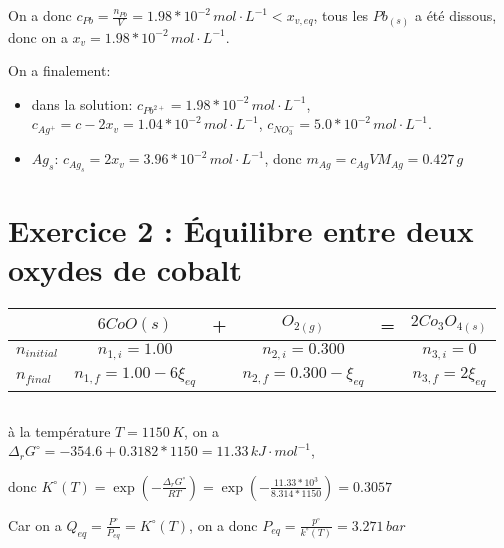 \documentclass[a4paper,12pt]{book}
\begin{document}
\hspace*{\fill} 

On a donc $c_{Pb}=\frac{n_{Pb}}{V}=1.98*10^{-2}\, mol\cdot L^{-1}<x_{v,eq}$, tous les $Pb_{(s)}$ a été dissous, donc on a $x_{v}=1.98*10^{-2}\, mol\cdot L^{-1}$. 

On a finalement:
\begin{itemize}
    \item dans la solution: $\boxed{c_{Pb^{2+}}=1.98*10^{-2}\, mol\cdot L^{-1}}$, $\boxed{c_{Ag^+}=c-2x_v=1.04*10^{-2}\, mol\cdot L^{-1}}$, $\boxed{c_{NO_3^-}=5.0*10^{-2}\,mol\cdot L^{-1}}$.
    \item $Ag_s$: $c_{Ag_s}=2x_v=3.96*10^{-2}\, mol\cdot L^{-1}$, donc $\boxed{m_{Ag}=c_{Ag}VM_{Ag}=0.427\,g}$
\end{itemize}

\section{Exercice 2 : Équilibre entre deux oxydes de cobalt}
\begin{table}[h]
\begin{center}
    \begin{tabular}{l|ccccc}
    \hline
                      & $6CoO{(s)}$      & + & $O_{2(g)}$       & = & $2Co_3O_{4(s)}$  \\ \hline
        $n_{initial}$ & $n_{1,i}=1.00$       &   & $n_{2,i}=0.300$      &   & $n_{3,i}=0$ \\ 
        $n_{final}$      & $n_{1,f}=1.00-6\xi_{eq}$  &   & $n_{2,f}=0.300-\xi_{eq}$  &   & $n_{3,f}=2\xi_{eq}$ \\ 
    \end{tabular}
\end{center}
\end{table}
\subsection{}
à la température $T = 1150\,K$, on a $\Delta_rG^\circ =-354.6 + 0.3182*1150=11.33\,kJ\cdot mol^{-1}$, 

\hspace*{\fill} 

donc $\boxed{K^\circ(T)=\exp(-\frac{\Delta_rG^\circ}{RT})=\exp(-\frac{11.33*10^3}{8.314*1150})=0.3057}$

\hspace*{\fill} 

Car on a $Q_{eq}=\frac{P^\circ}{P_{eq}}=K^\circ(T)$, on a donc $\boxed{P_{eq}=\frac{p^\circ}{k^\circ(T)}=3.271\,bar}$
\end{document}
